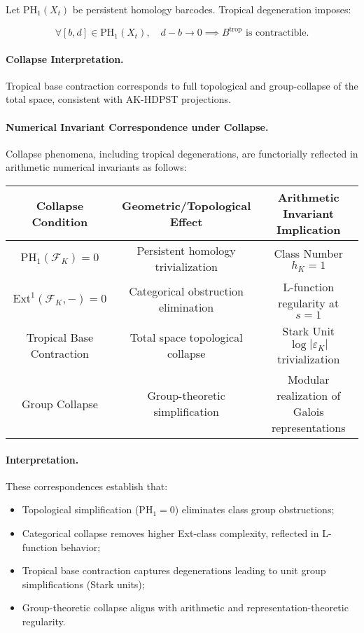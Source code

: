 \documentclass[11pt]{article}
\begin{document}
Let \( \mathrm{PH}_1(X_t) \) be persistent homology barcodes. Tropical degeneration imposes:

\[
\forall [b,d] \in \mathrm{PH}_1(X_t), \quad d - b \to 0 \implies B^{\mathrm{trop}} \text{ is contractible}.
\]

\paragraph{Collapse Interpretation.}
Tropical base contraction corresponds to full topological and group-collapse of the total space, consistent with AK-HDPST projections.

\paragraph{Numerical Invariant Correspondence under Collapse.}

Collapse phenomena, including tropical degenerations, are functorially reflected in arithmetic numerical invariants as follows:

\begin{center}
\renewcommand{\arraystretch}{1.4}
\begin{tabular}{|c|c|c|}
\hline
\textbf{Collapse Condition} & \textbf{Geometric/Topological Effect} & \textbf{Arithmetic Invariant Implication} \\
\hline
\( \mathrm{PH}_1(\mathcal{F}_K) = 0 \) & Persistent homology trivialization & Class Number \( h_K = 1 \) \\
\hline
\( \mathrm{Ext}^1(\mathcal{F}_K, -) = 0 \) & Categorical obstruction elimination & L-function regularity at \( s = 1 \) \\
\hline
Tropical Base Contraction & Total space topological collapse & Stark Unit \( \log |\varepsilon_K| \) trivialization \\
\hline
Group Collapse & Group-theoretic simplification & Modular realization of Galois representations \\
\hline
\end{tabular}
\end{center}

\paragraph{Interpretation.}
These correspondences establish that:

\begin{itemize}
    \item Topological simplification (\( \mathrm{PH}_1 = 0 \)) eliminates class group obstructions;
    \item Categorical collapse removes higher Ext-class complexity, reflected in L-function behavior;
    \item Tropical base contraction captures degenerations leading to unit group simplifications (Stark units);
    \item Group-theoretic collapse aligns with arithmetic and representation-theoretic regularity.
\end{itemize}
\end{document}
